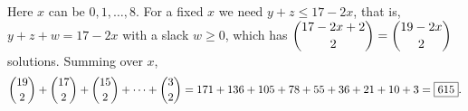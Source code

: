 Here $x$ can be $0,1,\dots,8$. For a fixed $x$ we need $y+z\le17-2x$, that is, $y+z+w=17-2x$ with a slack $w\ge0$, which has $\dbinom{17-2x+2}{2}=\dbinom{19-2x}{2}$ solutions. Summing over $x$,
\[\dbinom{19}{2}+\dbinom{17}{2}+\dbinom{15}{2}+\cdots+\dbinom{3}{2}=171+136+105+78+55+36+21+10+3=\boxed{615}.\]
